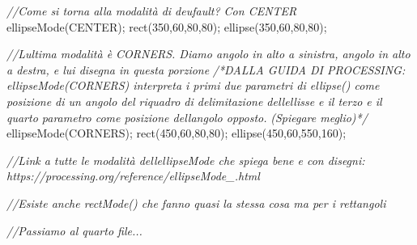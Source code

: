 \documentclass[
]{article}
\newenvironment{Shaded}{}{}
\newcommand{\CommentTok}[1]{\textcolor[rgb]{0.38,0.63,0.69}{\textit{#1}}}
\newcommand{\DecValTok}[1]{\textcolor[rgb]{0.25,0.63,0.44}{#1}}
\newcommand{\FunctionTok}[1]{\textcolor[rgb]{0.02,0.16,0.49}{#1}}
\newcommand{\NormalTok}[1]{#1}
\newcommand{\OperatorTok}[1]{\textcolor[rgb]{0.40,0.40,0.40}{#1}}
\begin{document}
\begin{Shaded}
\begin{Highlighting}[]
\CommentTok{//Come si torna alla modalità di deufault? Con \textquotesingle{}CENTER\textquotesingle{}}
\FunctionTok{ellipseMode}\OperatorTok{(}\NormalTok{CENTER}\OperatorTok{);}
\FunctionTok{rect}\OperatorTok{(}\DecValTok{350}\OperatorTok{,}\DecValTok{60}\OperatorTok{,}\DecValTok{80}\OperatorTok{,}\DecValTok{80}\OperatorTok{);}
\FunctionTok{ellipse}\OperatorTok{(}\DecValTok{350}\OperatorTok{,}\DecValTok{60}\OperatorTok{,}\DecValTok{80}\OperatorTok{,}\DecValTok{80}\OperatorTok{);}

\CommentTok{//L\textquotesingle{}ultima modalità è \textquotesingle{}CORNERS\textquotesingle{}. Diamo angolo in alto a sinistra, angolo in alto a destra, e lui disegna in questa porzione}
\CommentTok{/*DALLA GUIDA DI PROCESSING:}
\CommentTok{ellipseMode(CORNERS) interpreta i primi due parametri di ellipse() come posizione di un angolo del riquadro di delimitazione dell\textquotesingle{}ellisse e il terzo e il quarto parametro come posizione dell\textquotesingle{}angolo opposto.}
\CommentTok{(Spiegare meglio)*/}
\FunctionTok{ellipseMode}\OperatorTok{(}\NormalTok{CORNERS}\OperatorTok{);}
\FunctionTok{rect}\OperatorTok{(}\DecValTok{450}\OperatorTok{,}\DecValTok{60}\OperatorTok{,}\DecValTok{80}\OperatorTok{,}\DecValTok{80}\OperatorTok{);}
\FunctionTok{ellipse}\OperatorTok{(}\DecValTok{450}\OperatorTok{,}\DecValTok{60}\OperatorTok{,}\DecValTok{550}\OperatorTok{,}\DecValTok{160}\OperatorTok{);}

\CommentTok{//Link a tutte le modalità dell\textquotesingle{}ellipseMode che spiega bene e con disegni: https://processing.org/reference/ellipseMode\_.html}

\CommentTok{//Esiste anche \textquotesingle{}rectMode()\textquotesingle{} che fanno quasi la stessa cosa ma per i rettangoli}

\CommentTok{//Passiamo al quarto file...}
\end{Highlighting}
\end{Shaded}
\end{document}
